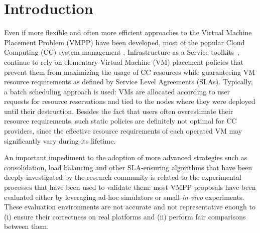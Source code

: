 \section{Introduction}
\label{sec:intro}

Even if more flexible and often more efficient approaches to the
Virtual Machine Placement Problem (VMPP) have been developed,
most of the popular Cloud Computing (CC) system
management \cite{cloudstack,opennebula,openstack}, \aka
Infrastructure-as-a-Service toolkits~\cite{moreno:2012}, continue to
rely on elementary Virtual Machine (VM) placement policies that
prevent them from maximizing the usage of CC resources while
guaranteeing VM resource requirements as defined by Service Level
Agreements (SLAs).
Typically, a batch scheduling approach is used: VMs are allocated
according to user requests for resource reservations and tied to
the nodes where they were deployed until their destruction. Besides
the fact that users often overestimate their resource requirements,
such static policies are definitely not optimal for CC providers,
since the effective resource requirements of each operated VM may
significantly vary during its lifetime.

An important impediment to the adoption of more advanced strategies
such as consolidation, load balancing and other SLA-ensuring
algorithms that have been deeply investigated by the research community
\cite{feller:ccgrid12,Hermenier:2009:ECM:1508293.1508300,quesnel:cpe2012,5328077,5935254} is related to the experimental
processes that have been used to validate them: most VMPP proposals have
been evaluated either by leveraging ad-hoc simulators or small \textit
{in-vivo} experiments. These evaluation environments are not accurate and not
representative enough to (i) ensure their correctness on real
platforms and (ii) perform fair comparisons between them.

